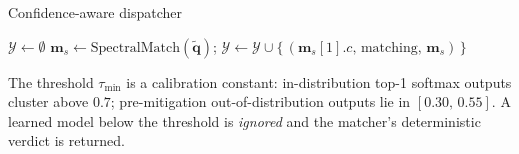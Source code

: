 \documentclass[10pt,aspectratio=169]{beamer}
\DeclareMathOperator*{\argmax}{arg\,max}
\begin{document}
\begin{frame}{Confidence-aware dispatcher}
\begin{algorithm}[H]
\footnotesize
\DontPrintSemicolon
{}
$\mathcal{Y} \gets \emptyset$\;
$\mathbf{m}_{s} \gets \mathrm{SpectralMatch}(\tilde{\mathbf{q}})$;\quad
   $\mathcal{Y} \gets \mathcal{Y} \cup \bigl\{\,(\mathbf{m}_{s}[1].c,\,\text{matching},\,\mathbf{m}_{s})\,\bigr\}$\;
\Return{$\argmax_{(c, \delta, \mathbf{m})\,\in\,\mathcal{Y}}\, c$}\;
\caption{\textsc{AutoIdentify}: dispatches to the most confident identifier.}
\end{algorithm}
\smallskip
The threshold $\tau_{\min}$ is a calibration constant: in-distribution
top-1 softmax outputs cluster above $0.7$; pre-mitigation
out-of-distribution outputs lie in $[0.30,\,0.55]$.
A learned model below the threshold is \emph{ignored} and the matcher's
deterministic verdict is returned.
\end{frame}
\end{document}
